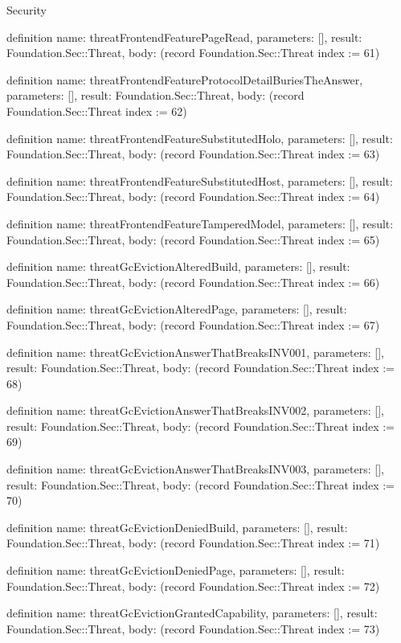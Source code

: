 \begin{lexlean}{Security}
\begin{semanticmodule}
definition{
  name: threatFrontendFeaturePageRead,
  parameters: [],
  result: Foundation.Sec::Threat,
  body: (record Foundation.Sec::Threat {index := 61})
}

definition{
  name: threatFrontendFeatureProtocolDetailBuriesTheAnswer,
  parameters: [],
  result: Foundation.Sec::Threat,
  body: (record Foundation.Sec::Threat {index := 62})
}

definition{
  name: threatFrontendFeatureSubstitutedHolo,
  parameters: [],
  result: Foundation.Sec::Threat,
  body: (record Foundation.Sec::Threat {index := 63})
}

definition{
  name: threatFrontendFeatureSubstitutedHost,
  parameters: [],
  result: Foundation.Sec::Threat,
  body: (record Foundation.Sec::Threat {index := 64})
}

definition{
  name: threatFrontendFeatureTamperedModel,
  parameters: [],
  result: Foundation.Sec::Threat,
  body: (record Foundation.Sec::Threat {index := 65})
}

definition{
  name: threatGcEvictionAlteredBuild,
  parameters: [],
  result: Foundation.Sec::Threat,
  body: (record Foundation.Sec::Threat {index := 66})
}

definition{
  name: threatGcEvictionAlteredPage,
  parameters: [],
  result: Foundation.Sec::Threat,
  body: (record Foundation.Sec::Threat {index := 67})
}

definition{
  name: threatGcEvictionAnswerThatBreaksINV001,
  parameters: [],
  result: Foundation.Sec::Threat,
  body: (record Foundation.Sec::Threat {index := 68})
}

definition{
  name: threatGcEvictionAnswerThatBreaksINV002,
  parameters: [],
  result: Foundation.Sec::Threat,
  body: (record Foundation.Sec::Threat {index := 69})
}

definition{
  name: threatGcEvictionAnswerThatBreaksINV003,
  parameters: [],
  result: Foundation.Sec::Threat,
  body: (record Foundation.Sec::Threat {index := 70})
}

definition{
  name: threatGcEvictionDeniedBuild,
  parameters: [],
  result: Foundation.Sec::Threat,
  body: (record Foundation.Sec::Threat {index := 71})
}

definition{
  name: threatGcEvictionDeniedPage,
  parameters: [],
  result: Foundation.Sec::Threat,
  body: (record Foundation.Sec::Threat {index := 72})
}

definition{
  name: threatGcEvictionGrantedCapability,
  parameters: [],
  result: Foundation.Sec::Threat,
  body: (record Foundation.Sec::Threat {index := 73})
}


\end{semanticmodule}
\end{lexlean}
